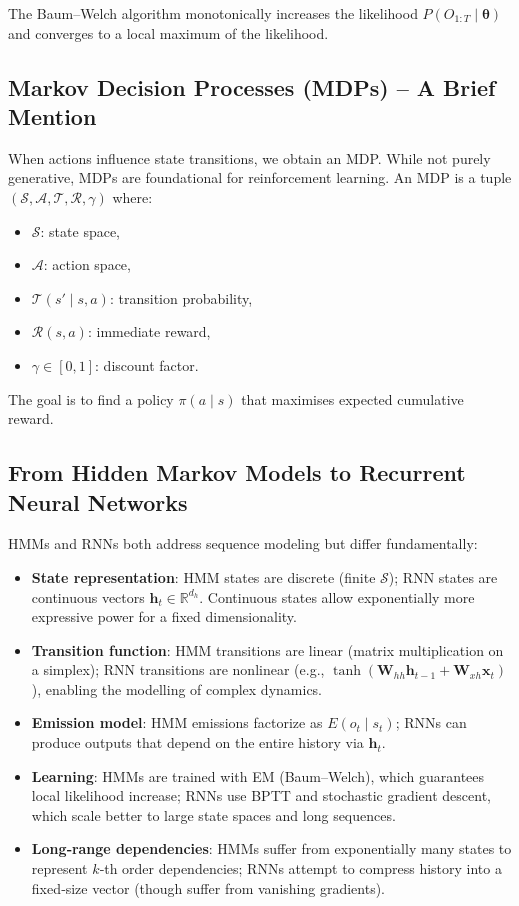 \documentclass{tufte-handout}
\let\subsubsection\subsection
\begin{document}
\begin{thm}
    The Baum–Welch algorithm monotonically increases the likelihood $P(O_{1:T} \mid \boldsymbol{\theta})$ and converges to a local maximum of the likelihood.
\end{thm}

\subsubsection{Markov Decision Processes (MDPs) – A Brief Mention}

When actions influence state transitions, we obtain an MDP. While not purely generative, MDPs are foundational for reinforcement learning. An MDP is a tuple $(\mathcal{S}, \mathcal{A}, \mathcal{T}, \mathcal{R}, \gamma)$ where:
\begin{itemize}
    \item $\mathcal{S}$: state space,
    \item $\mathcal{A}$: action space,
    \item $\mathcal{T}(s' \mid s, a)$: transition probability,
    \item $\mathcal{R}(s,a)$: immediate reward,
    \item $\gamma \in [0,1]$: discount factor.
\end{itemize}
The goal is to find a policy $\pi(a \mid s)$ that maximises expected cumulative reward.

\subsubsection{From Hidden Markov Models to Recurrent Neural Networks}

HMMs and RNNs both address sequence modeling but differ fundamentally:

\begin{itemize}
    \item \textbf{State representation}: HMM states are discrete (finite $\mathcal{S}$); RNN states are continuous vectors $\mathbf{h}_t \in \mathbb{R}^{d_h}$. Continuous states allow exponentially more expressive power for a fixed dimensionality.
    \item \textbf{Transition function}: HMM transitions are linear (matrix multiplication on a simplex); RNN transitions are nonlinear (e.g., $\tanh(\mathbf{W}_{hh}\mathbf{h}_{t-1} + \mathbf{W}_{xh}\mathbf{x}_t)$), enabling the modelling of complex dynamics.
    \item \textbf{Emission model}: HMM emissions factorize as $E(o_t \mid s_t)$; RNNs can produce outputs that depend on the entire history via $\mathbf{h}_t$.
    \item \textbf{Learning}: HMMs are trained with EM (Baum–Welch), which guarantees local likelihood increase; RNNs use BPTT and stochastic gradient descent, which scale better to large state spaces and long sequences.
    \item \textbf{Long‑range dependencies}: HMMs suffer from exponentially many states to represent $k$‑th order dependencies; RNNs attempt to compress history into a fixed‑size vector (though suffer from vanishing gradients).
\end{itemize}
\end{document}
